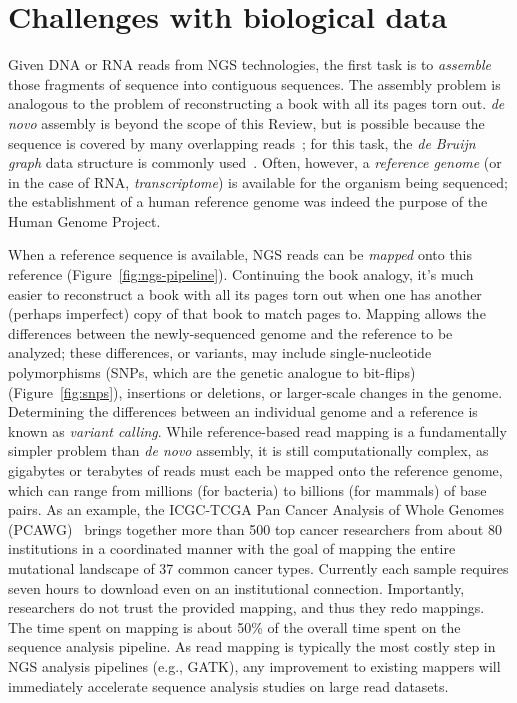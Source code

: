 \documentclass{acm_proc_article-sp}
\begin{document}
\section{Challenges with biological data}

Given DNA or RNA reads from NGS technologies, the first task is to 
\emph{assemble} those fragments of sequence into contiguous sequences.
The assembly problem is analogous to the problem of 
reconstructing a book with all its pages torn out.
\emph{de novo} assembly is beyond the scope of this Review, but is
possible because the sequence is covered by many
overlapping reads~\cite{berger2013computational}; for this task, the \emph{de Bruijn graph}
data structure is commonly used~\cite{bruijn1946combinatorial}.
Often, however, a \emph{reference genome} (or in the case of RNA, 
\emph{transcriptome}) is available for the organism being sequenced; the
establishment of a human reference genome was indeed the purpose of the Human
Genome Project.

When a reference sequence is available, NGS reads can be \emph{mapped} onto
this reference (Figure~\ref{fig:ngs-pipeline}).
Continuing the book analogy, it's much easier to reconstruct a book with all its pages torn out when one has another (perhaps imperfect) copy of that book to match pages to.
Mapping allows the differences between the newly-sequenced genome and the 
reference to be analyzed; these differences, or variants, may include single-nucleotide polymorphisms
(SNPs, which are the genetic analogue to bit-flips) (Figure~\ref{fig:snps}), 
insertions or deletions, or larger-scale changes in the genome.
Determining the differences between an individual genome and a reference is
known as \emph{variant calling}.
While reference-based read mapping is a fundamentally simpler problem than
\emph{de novo} assembly, it is still computationally complex, as gigabytes or
terabytes of reads must each be mapped onto the reference genome, which can 
range from millions (for bacteria) to billions (for mammals) of base pairs.
As an example, the ICGC-TCGA Pan Cancer Analysis of Whole Genomes 
(PCAWG)~\cite{weinstein2013cancer} brings together more than 500 top cancer 
researchers from about 80 institutions in a coordinated manner with the goal of 
mapping the entire mutational landscape of 37 common cancer types. 
Currently each sample requires seven hours to download even on an institutional 
connection. 
Importantly, researchers do not trust the provided mapping, and thus they redo mappings. 
The time spent on mapping is about 50\% of the overall time spent on the sequence analysis pipeline. 
As read mapping is typically the most costly step in NGS analysis pipelines (e.g., GATK), any improvement to existing mappers will immediately accelerate sequence analysis studies on large read datasets.
\end{document}
